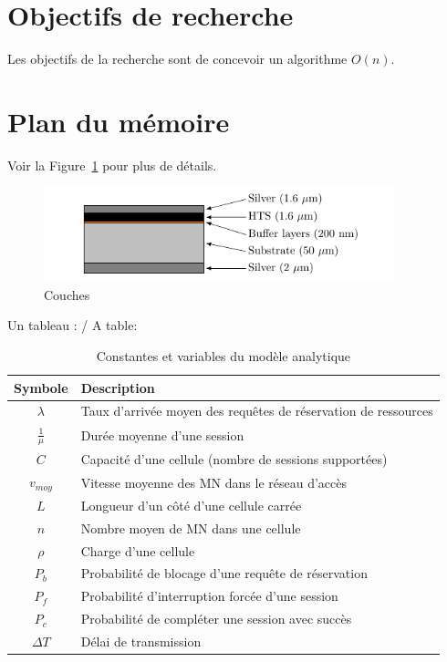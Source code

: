 \section{Objectifs de recherche}  %
Les objectifs de la recherche sont de concevoir un algorithme $O(n)$.


\section{Plan du mémoire}  %

Voir la Figure~\ref{fig:Layers} pour plus de détails. 

\begin{figure}[htb]
\centering
\includegraphics[width=4in]{demo_tikz}
\caption{Couches}
\label{fig:Layers}
\end{figure}


Un tableau : / A table:
\begin{table}[htb]
  \centering
  \caption{Constantes et variables du modèle analytique}
  \begin{tabular}{|c|l|}
    \hline\rowcolor[gray]{0.8}\color{black}
    Symbole         & Description\\\hline
    $\lambda$       & Taux d'arrivée moyen des requêtes de réservation de ressources\\\hline
    $\frac{1}{\mu}$ & Durée moyenne d'une session\\\hline
    $C$             & Capacité d'une cellule (nombre de sessions supportées)\\\hline
    $v_{moy}$       & Vitesse moyenne des MN dans le réseau d'accès\\\hline
    $L$             & Longueur d'un côté d'une cellule carrée\\\hline
    $n$             & Nombre moyen de MN dans une cellule\\\hline
    $\rho$          & Charge d'une cellule\\\hline
    $P_b$           & Probabilité de blocage d'une requête de réservation\\\hline
    $P_f$           & Probabilité d'interruption forcée d'une session\\\hline
    $P_c$           & Probabilité de compléter une session avec succès\\\hline
    $\Delta{}T$     & Délai de transmission\\\hline
  \end{tabular}
  \label{tab:Definitions}
\end{table}

